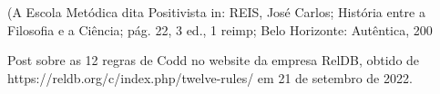 \documentclass[
12pt,		%
openright,	%
twoside,  %
a4paper,			%
chapter=TITLE,		%
english,			%
french,				%
spanish,			%
brazil				%
]{USPSC-classe/USPSC}
\begin{document}
\begin{flushleft}
\begin{flushleft}
\begin{flushleft}
\begin{flushleft}
\begin{flushleft}
\begin{flushleft}
\begin{flushleft}
\begin{flushleft}
\begin{flushleft}
[REIS , 2006] (A Escola Met\'odica dita Positivista in: REIS, Jos\'e Carlos; Hist\'oria entre a Filosofia e a Ci\^encia; p\'ag. 22, 3 ed., 1 reimp; Belo Horizonte: Aut\^entica, 200
\end{flushleft}


\end{flushleft}


\end{flushleft}


\end{flushleft}


\end{flushleft}


\end{flushleft}


\end{flushleft}


\end{flushleft}


\end{flushleft}


\begin{flushleft}
\begin{flushleft}
\begin{flushleft}
\begin{flushleft}
\begin{flushleft}
\begin{flushleft}
\begin{flushleft}
\begin{flushleft}
\begin{flushleft}
[RelDB, 2019] Post sobre as 12 regras de Codd no website da empresa RelDB, obtido de https://reldb.org/c/index.php/twelve-rules/ em 21 de setembro de 2022.
\end{flushleft}


\end{flushleft}


\end{flushleft}


\end{flushleft}


\end{flushleft}


\end{flushleft}


\end{flushleft}


\end{flushleft}


\end{flushleft}
\end{document}
